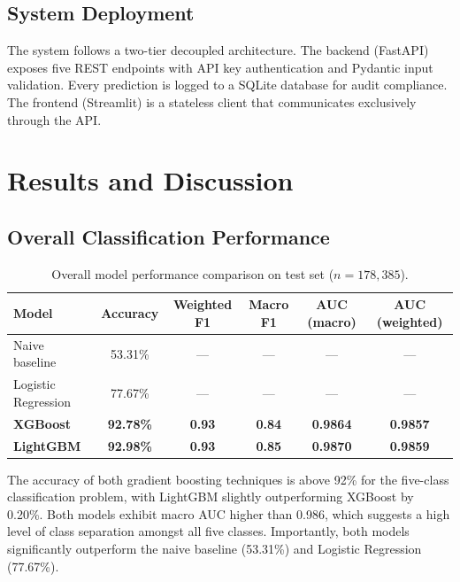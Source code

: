\documentclass[12pt,a4paper]{report}
\begin{document}
\section{System Deployment}

The system follows a two-tier decoupled architecture. The backend (FastAPI) exposes five REST endpoints with API key authentication and Pydantic input validation. Every prediction is logged to a SQLite database for audit compliance. The frontend (Streamlit) is a stateless client that communicates exclusively through the API.


\chapter{Results and Discussion}

\section{Overall Classification Performance}

\begin{table}[H]
\centering
\caption{Overall model performance comparison on test set ($n = 178{,}385$).}
\label{tab:overall_report}
\begin{tabular}{lccccc}
\hline
\textbf{Model} & \textbf{Accuracy} & \textbf{Weighted F1} & \textbf{Macro F1} & \textbf{AUC (macro)} & \textbf{AUC (weighted)} \\
\hline
Naive baseline & 53.31\% & --- & --- & --- & --- \\
Logistic Regression & 77.67\% & --- & --- & --- & --- \\
\textbf{XGBoost} & \textbf{92.78\%} & \textbf{0.93} & \textbf{0.84} & \textbf{0.9864} & \textbf{0.9857} \\
\textbf{LightGBM} & \textbf{92.98\%} & \textbf{0.93} & \textbf{0.85} & \textbf{0.9870} & \textbf{0.9859} \\
\hline
\end{tabular}
\end{table}

The accuracy of both gradient boosting techniques is above 92\% for the five-class classification problem, with LightGBM slightly outperforming XGBoost by 0.20\%. Both models exhibit macro AUC higher than 0.986, which suggests a high level of class separation amongst all five classes. Importantly, both models significantly outperform the naive baseline (53.31\%) and Logistic Regression (77.67\%).
\end{document}
